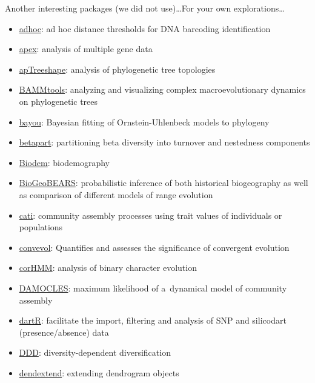 \documentclass[compress, ucs, xelatex, 11pt, xcolor=svgnames,
  hyperref={
    bookmarks=true,
    unicode=true,
    colorlinks=true,
    pdftitle={Molecular data in R},
    plainpages=false,
    pdfauthor={Vojtech Zeisek},
    pdfsubject={Course about phylogeny and evolution in R},
    pdfcreator={XeLaTeX},
    pdfkeywords={R, evolution, phylogeny, molecular data},
    linkcolor=Tomato,
    anchorcolor=SaddleBrown,
    citecolor=Goldenrod,
    filecolor=DarkMagenta,
    menucolor=Sienna,
    urlcolor=DarkTurquoise,
    pdftex},
  url={hyphens, lowtilde} %
  ]{beamer}
\begin{document}
\begin{frame}[allowframebreaks]{Another interesting packages (we did not use)\ldots}{For your own explorations\ldots}
  \begin{itemize}
    \item \href{https://CRAN.R-project.org/package=adhoc}{adhoc}: ad hoc distance thresholds for DNA barcoding identification
    \item \href{https://CRAN.R-project.org/package=apex}{apex}: analysis of multiple gene data
    \item \href{https://CRAN.R-project.org/package=apTreeshape}{apTreeshape}: analysis of phylogenetic tree topologies
    \item \href{https://CRAN.R-project.org/package=BAMMtools}{BAMMtools}: analyzing and visualizing complex macroevolutionary dynamics on phylogenetic trees
    \item \href{https://CRAN.R-project.org/package=bayou}{bayou}: Bayesian fitting of Ornstein-Uhlenbeck models to phylogeny
    \item \href{https://CRAN.R-project.org/package=betapart}{betapart}: partitioning beta diversity into turnover and nestedness components
    \item \href{https://CRAN.R-project.org/package=Biodem}{Biodem}: biodemography
    \item \href{https://CRAN.R-project.org/package=BioGeoBEARS}{BioGeoBEARS}: probabilistic inference of both historical biogeography as well as comparison of different models of range evolution
    \item \href{https://CRAN.R-project.org/package=cati}{cati}: community assembly processes using trait values of individuals or populations
    \item \href{https://CRAN.R-project.org/package=convevol}{convevol}: Quantifies and assesses the significance of convergent evolution
    \item \href{https://CRAN.R-project.org/package=corHMM}{corHMM}: analysis of binary character evolution
    \item \href{https://CRAN.R-project.org/package=DAMOCLES}{DAMOCLES}: maximum likelihood of a~dynamical model of community assembly
    \item \href{https://CRAN.R-project.org/package=dartR}{dartR}: facilitate the import, filtering and analysis of SNP and silicodart (presence/absence) data
    \item \href{https://CRAN.R-project.org/package=DDD}{DDD}: diversity-dependent diversification
    \item \href{https://CRAN.R-project.org/package=dendextend}{dendextend}: extending dendrogram objects

\end{itemize}
\end{frame}
\end{document}
